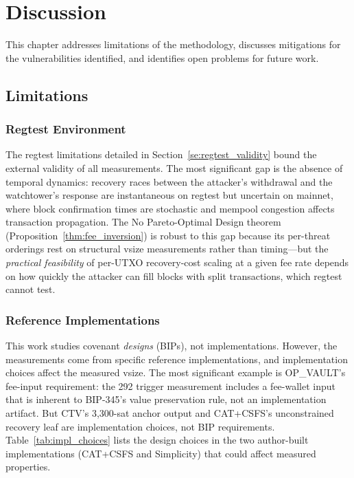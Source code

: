 \chapter{Discussion} \label{ch:discussion}

This chapter addresses limitations of the methodology, discusses mitigations for
the vulnerabilities identified, and identifies open problems for future work.

\section{Limitations} \label{se:limitations}

\subsection{Regtest Environment}

The regtest limitations detailed in Section~\ref{se:regtest_validity} bound the
external validity of all measurements. The most significant gap is the absence of
temporal dynamics: recovery races between the attacker's withdrawal and the
watchtower's response are instantaneous on regtest but uncertain on mainnet, where
block confirmation times are stochastic and mempool congestion affects transaction
propagation. The No Pareto-Optimal Design theorem
(Proposition~\ref{thm:fee_inversion}) is robust to this gap because its
per-threat orderings rest on structural vsize measurements rather than
timing---but the \emph{practical feasibility} of per-UTXO recovery-cost scaling
at a given fee rate depends on how quickly the attacker can fill
blocks with split transactions, which regtest cannot test.

\subsection{Reference Implementations} \label{se:impl_choices}

This work studies covenant \emph{designs} (BIPs), not implementations. However, the
measurements come from specific reference implementations, and implementation choices
affect the measured vsize. The most significant example is OP\_VAULT's fee-input
requirement: the 292\vB{} trigger measurement includes a fee-wallet input that is
inherent to BIP-345's value preservation rule, not an implementation artifact. But
CTV's 3{,}300-sat anchor output and CAT+CSFS's unconstrained recovery leaf are
implementation choices, not BIP requirements. Table~\ref{tab:impl_choices} lists
the design choices in the two author-built implementations (CAT+CSFS and Simplicity)
that could affect measured properties.

